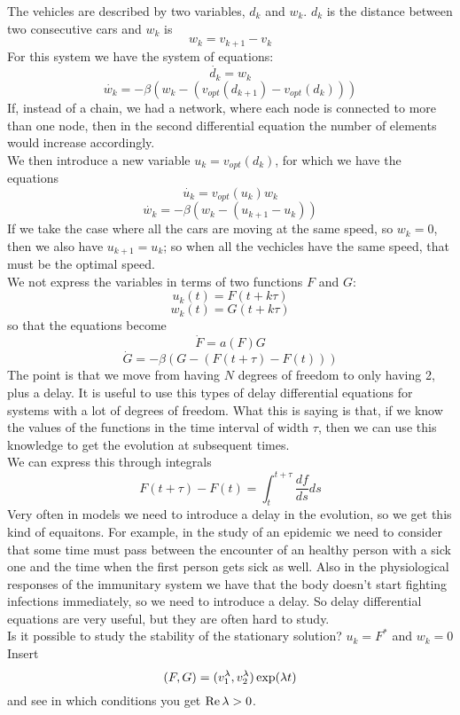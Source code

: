 The vehicles are described by two variables, $d_k$ and $w_k$. $d_k$ is the distance between two consecutive cars and $w_k$ is
$$
	w_k = v_{k+1} - v_k
$$
For this system we have the system of equations:
$$
	\dot{d_k} = w_k
$$
$$
	\dot{w_k} = -\beta(w_k -(v_{opt}(d_{k+1}) - v_{opt}(d_k)))
$$
If, instead of a chain, we had a network, where each node is connected to more than one node, then in the second differential equation the number of elements would increase accordingly. \\
We then introduce a new variable $u_k = v_{opt}(d_k)$, for which we have the equations
$$
	\dot{u_k} = v_{opt}(u_k)w_k
$$
$$
	\dot{w_k} = -\beta(w_k - (u_{k+1} - u_k))
$$
If we take the case where all the cars are moving at the same speed, so $w_k = 0$, then we also have $u_{k+1} = u_k$; so when all the vechicles have the same speed, that must be the optimal speed. \\
We not express the variables in terms of two functions $F$ and $G$:
$$
	u_k(t) = F(t + k\tau)
$$
$$
	w_k(t) = G(t + k\tau)
$$
so that the equations become
$$
	\dot{F} = a(F)G
$$
$$
	\dot{G} = -\beta(G - (F(t+\tau) - F(t)))
$$
The point is that we move from having $N$ degrees of freedom to only having 2, plus a delay. It is useful to use this types of delay differential equations for systems with a lot of degrees of freedom. What this is saying is that, if we know the values of the functions in the time interval of width $\tau$, then we can use this knowledge to get the evolution at subsequent times. \\
We can express this through integrals
$$
	F(t+\tau) - F(t) = \int_t^{t+\tau} \frac{df}{ds}ds
$$
Very often in models we need to introduce a delay in the evolution, so we get this kind of equaitons. For example, in the study of an epidemic we need to consider that some time must pass between the encounter of an healthy person with a sick one and the time when the first person gets sick as well. Also in the physiological responses of the immunitary system we have that the body doesn't start fighting infections immediately, so we need to introduce a delay. So delay differential equations are very useful, but they are often hard to study. \\
Is it possible to study the stability of the stationary solution? $u_k = F^*$ and $w_k = 0$ \\
Insert 
$$
	(F,G) = (v_1^\lambda, v_2^\lambda)\exp(\lambda t)
$$
and see in which conditions you get $\Re \lambda > 0$. \\

